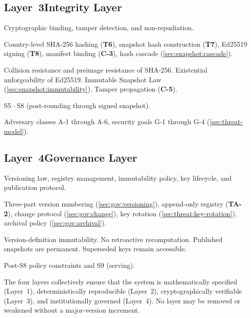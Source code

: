 \subsection*{Layer~3\enspace Integrity Layer}

\begin{description}[style=sameline, leftmargin=1em]
  \item[Scope.]  Cryptographic binding, tamper detection, and
    non-repudiation.
  \item[Core operations.]  Country-level SHA-256 hashing (\textbf{T6}),
    snapshot hash construction (\textbf{T7}), Ed25519 signing
    (\textbf{T8}), manifest binding (\textbf{C-3}), hash cascade
    (\cref{sec:snapshot:cascade}).
  \item[Invariants.]  Collision resistance and preimage resistance of
    SHA-256.  Existential unforgeability of Ed25519.  Immutable Snapshot
    Law (\cref{sec:snapshot:immutability}).  Tamper propagation
    (\textbf{C-5}).
  \item[State coverage.]  S5\,--\,S8 (post-rounding through signed
    snapshot).
  \item[Security model.]  Adversary classes A-1 through A-6, security
    goals G-1 through G-4 (\cref{sec:threat-model}).
\end{description}

\subsection*{Layer~4\enspace Governance Layer}

\begin{description}[style=sameline, leftmargin=1em]
  \item[Scope.]  Versioning law, registry management, immutability policy,
    key lifecycle, and publication protocol.
  \item[Core operations.]  Three-part version numbering
    (\cref{sec:gov:versioning}), append-only registry (\textbf{TA-2}),
    change protocol (\cref{sec:gov:change}), key rotation
    (\cref{sec:threat:key-rotation}), archival policy
    (\cref{sec:gov:archival}).
  \item[Invariants.]  Version-definition immutability.  No retroactive
    recomputation.  Published snapshots are permanent.  Superseded keys
    remain accessible.
  \item[State coverage.]  Post-S8 policy constraints and S9 (serving).
\end{description}

\bigskip

The four layers collectively ensure that the \ISI system is
mathematically specified (Layer~1), deterministically reproducible
(Layer~2), cryptographically verifiable (Layer~3), and institutionally
governed (Layer~4).  No layer may be removed or weakened without a
major-version increment.

